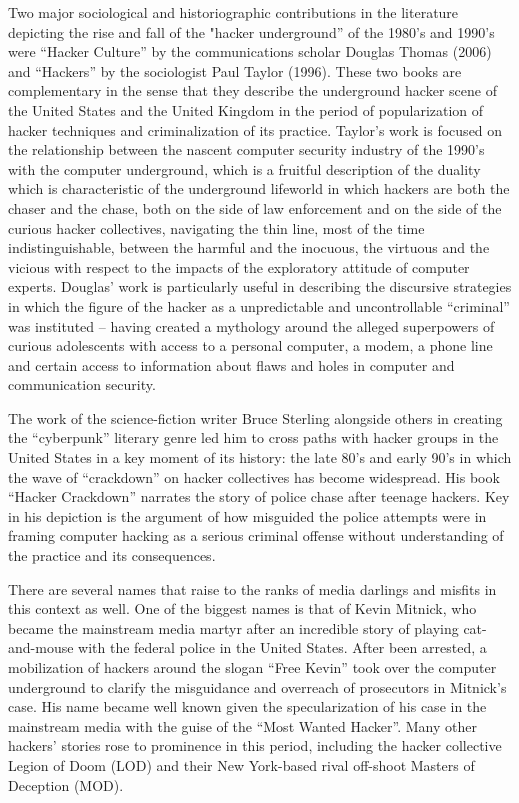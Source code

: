 \documentclass[10pt,letter,oneside]{scrartcl}
\begin{document}
Two major sociological and historiographic contributions in the literature
depicting the rise and fall of the "hacker underground'' of the 1980's and
1990's were ``Hacker Culture'' by the communications scholar Douglas Thomas
(2006) and ``Hackers'' by the sociologist Paul Taylor (1996). These two books are
complementary in the sense that they describe the underground hacker scene of
the United States and the United Kingdom in the period of popularization of
hacker techniques and criminalization of its practice. Taylor's work is focused 
on the relationship between the nascent computer security industry of the 1990's 
with the computer underground, which is a fruitful description of the
duality which is characteristic of the underground lifeworld in which 
hackers are both the chaser and the chase, both on the side of law enforcement 
and on the side of the curious hacker collectives, navigating the thin line, most of the time indistinguishable, between the harmful and the inocuous, the virtuous and the
vicious with respect to the impacts of the exploratory attitude of computer
experts.  Douglas' work is particularly useful in describing the discursive
strategies in which the figure of the hacker as a unpredictable and uncontrollable ``criminal'' was instituted -- having created a mythology around the alleged 
superpowers of curious adolescents with access to a personal computer, a modem, a phone line and certain access to information about flaws and holes in computer and communication
security.

The work of the science-fiction writer Bruce Sterling alongside others in creating
the ``cyberpunk'' literary genre led him to cross paths with hacker groups in the
United States in a key moment of its history: the late 80's and early 90's in which
the wave of ``crackdown'' on hacker collectives has become widespread. His book 
``Hacker Crackdown'' narrates the story of police chase after teenage hackers. 
Key in his depiction is the argument of how misguided the police attempts were 
in framing computer hacking as a serious criminal offense without understanding of 
the practice and its consequences. 

There are several names that raise to the ranks of media darlings and misfits in this
context as well.  One of the biggest names is that of Kevin Mitnick, who became the mainstream media martyr after an incredible story of playing cat-and-mouse with 
the federal police in the United States.  After been arrested, a mobilization of hackers around the slogan ``Free Kevin'' took over the computer underground to clarify 
the misguidance and overreach of prosecutors in Mitnick's case.  His name became 
well known given the specularization of his case in the mainstream media with the
guise of the ``Most Wanted Hacker''.  Many other hackers' stories rose to prominence
in this period, including the hacker collective Legion of Doom (LOD) and their New 
York-based rival off-shoot Masters of Deception (MOD).
\end{document}
